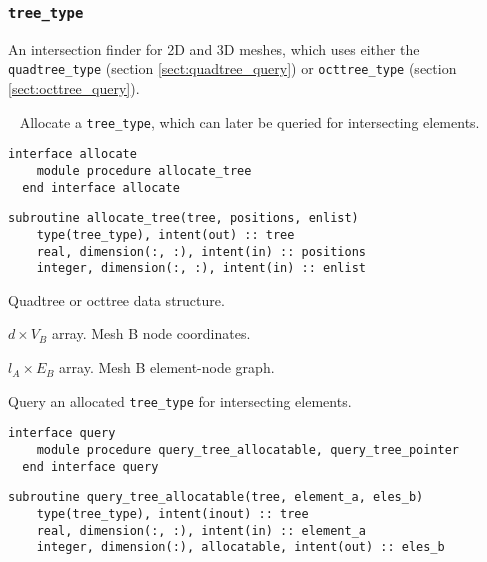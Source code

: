 \documentclass{article}
\begin{document}
\subsubsection{\texttt{tree\_type}}

An intersection finder for 2D and 3D meshes, which uses either the
\verb+quadtree_type+ (section \ref{sect:quadtree_query}) or \verb+octtree_type+
(section \ref{sect:octtree_query}).

~\newline
Allocate a \verb+tree_type+, which can later be queried for intersecting
elements.

\begin{lstlisting}[language=FORTRAN]
  interface allocate
    module procedure allocate_tree
  end interface allocate
\end{lstlisting}
  
\begin{lstlisting}[language=FORTRAN]
  subroutine allocate_tree(tree, positions, enlist)
    type(tree_type), intent(out) :: tree
    real, dimension(:, :), intent(in) :: positions
    integer, dimension(:, :), intent(in) :: enlist
\end{lstlisting}

\begin{description}[font=\ttfamily\bfseries,leftmargin=2.2\parindent,labelindent=1.7\parindent,noitemsep]
  \item[tree] Quadtree or octtree data structure.
  \item[positions] $d \times V_B$ array. Mesh B node coordinates.
  \item[enlist] $l_A \times E_B$ array. Mesh B element-node graph.
\end{description}

\noindent Query an allocated \verb+tree_type+ for intersecting elements.
  
\begin{lstlisting}[language=FORTRAN]
  interface query
    module procedure query_tree_allocatable, query_tree_pointer
  end interface query
\end{lstlisting}
    
\begin{lstlisting}[language=FORTRAN]  
  subroutine query_tree_allocatable(tree, element_a, eles_b)
    type(tree_type), intent(inout) :: tree
    real, dimension(:, :), intent(in) :: element_a
    integer, dimension(:), allocatable, intent(out) :: eles_b
\end{lstlisting}
  
\end{document}
